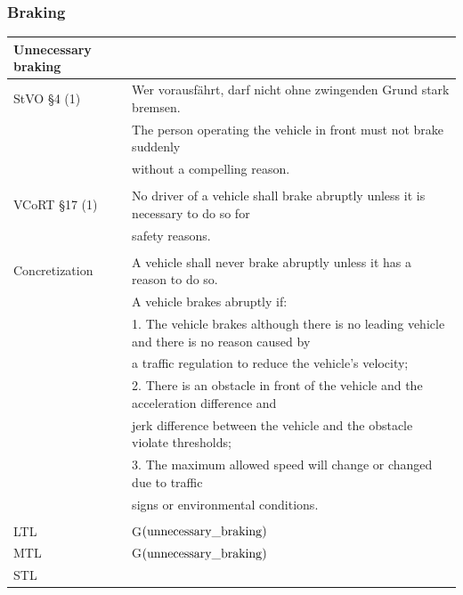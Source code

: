 \subsubsection{Braking}
\begin{table}[H]
\centering
\begin{tabular}[t]{ll}
\toprule
\textbf{Unnecessary braking} & \\
\midrule
	StVO \S 4 (1) & Wer vorausfährt, darf nicht ohne zwingenden Grund stark bremsen.\\
	& The person operating the vehicle in front must not brake suddenly \\
	& without a compelling reason.\\
	&\\
	VCoRT \S 17 (1) &  No driver of a vehicle shall brake abruptly unless it is necessary to do so for\\
	&  safety reasons.\\
	&\\
	Concretization &  A vehicle shall never brake abruptly unless it has a reason to do so. \\
	& A vehicle brakes abruptly if: \\
	& 1. The vehicle brakes although there is no leading vehicle and there is no reason caused by \\
	& a traffic regulation to reduce the vehicle's velocity; \\ 
	& 2. There is an obstacle in front of the vehicle and the acceleration difference and \\
	& jerk difference between the vehicle and the obstacle violate thresholds; \\
	& 3. The maximum allowed speed will change or changed due to traffic \\
	& signs or environmental conditions.\\
	&\\
	LTL & G$(\operatorname*{unnecessary\_braking})$\\
	MTL & G$(\operatorname*{unnecessary\_braking})$\\
	STL & \\
\bottomrule
\end{tabular}
\end{table}%

